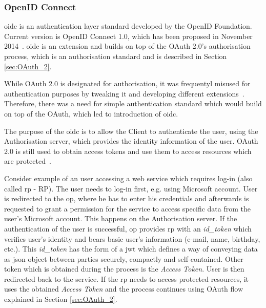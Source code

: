 \subsubsection{OpenID Connect}\label{sec:oidc}

\acrfull{oidc} is an authentication layer standard developed by the OpenID Foundation. Current version is OpenID Connect 1.0, which has been proposed in November 2014~\cite{Sakimura2014Final:1}. \acrshort{oidc} is an extension and builds on top of the OAuth 2.0’s authorisation process, which is an authorisation standard and is described in Section \ref{sec:OAuth_2}. 

While OAuth 2.0 is designated for authorisation, it was frequentyl misused for authentication purposes by tweaking it and developing different extensions~\cite{RicherUser2.0}. Therefore, there was a need for simple authentication standard which would build on top of the OAuth, which led to introduction of \acrshort{oidc}.

The purpose of the \acrshort{oidc} is to allow the Client to authenticate the user, using the Authorisation server, which provides the identity information of the user. OAuth 2.0 is still used to obtain access tokens and use them to access resources which are protected~\cite{OpenIDSpecs}. 

Consider example of an user accessing a web service which requires log-in (also called \acrlong{rp} - RP). The user needs to log-in first, e.g. using Microsoft account. User is redirected to the \acrfull{op}, where he has to enter his credentials and afterwards is requested to grant a permission for the service to access specific data from the user's Microsoft account. This happens on the Authorisation server. If the authentication of the user is successful, \acrshort{op} provides \acrfull{rp} with an \textit{id\_token} which verifies user’s identity and bears basic user’s information (e-mail, name, birthday, etc.). This \textit{id\_token} has the form of a \acrfull{jwt} which defines a way of conveying data as \acrshort{json} object between parties securely, compactly and self-contained. Other token which is obtained during the process is the \textit{Access Token}. User is then redirected back to the service. If the  \acrshort{rp} needs to access protected resources, it uses the obtained \textit{Access Token} and the process continues using OAuth flow explained in Section \ref{sec:OAuth_2}.